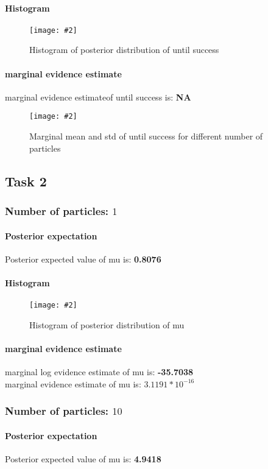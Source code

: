 \documentclass{article}
\newcommand{\centerfigcap}[3]{\begin{figure}[H]
\begin{center}\texttt{[image: \#2]} \caption{#3}\end{center}
\end{figure}}
\begin{document}
\paragraph{Histogram}
\centerfigcap{0.6}{../Figures/Histogram_1_5}{Histogram of posterior distribution of until success}
\paragraph{marginal evidence estimate}
marginal evidence estimateof until success is: \textbf{NA}\\

\centerfigcap{0.6}{../Figures/Mean-Std_1}{Marginal mean and std of until success for different number of particles}
\pagebreak
\subsection{Task 2}
\subsubsection{Number of particles: $1$}
\paragraph{Posterior expectation}
Posterior expected value of mu is: \textbf{0.8076}\\

\paragraph{Histogram}
\centerfigcap{0.6}{../Figures/Histogram_2_0}{Histogram of posterior distribution of mu}
\paragraph{marginal evidence estimate}
marginal log evidence estimate of mu is: \textbf{-35.7038}\\
marginal evidence estimate of mu is: \textbf{$3.1191*10^{-16}$}\\

\pagebreak
\subsubsection{Number of particles: $10$}
\paragraph{Posterior expectation}
Posterior expected value of mu is: \textbf{4.9418}\\
\end{document}
